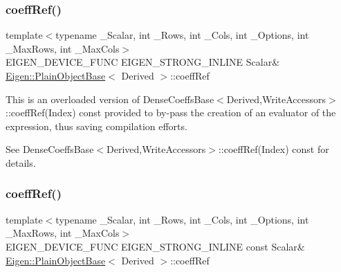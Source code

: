 \subsubsection{\texorpdfstring{coeffRef()}{coeffRef()}\hspace{0.1cm}{\footnotesize\ttfamily [2/4]}}
{\footnotesize\ttfamily template$<$typename \+\_\+\+Scalar, int \+\_\+\+Rows, int \+\_\+\+Cols, int \+\_\+\+Options, int \+\_\+\+Max\+Rows, int \+\_\+\+Max\+Cols$>$ \\
E\+I\+G\+E\+N\+\_\+\+D\+E\+V\+I\+C\+E\+\_\+\+F\+U\+NC E\+I\+G\+E\+N\+\_\+\+S\+T\+R\+O\+N\+G\+\_\+\+I\+N\+L\+I\+NE Scalar\& \mbox{\hyperlink{class_eigen_1_1_plain_object_base}{Eigen\+::\+Plain\+Object\+Base}}$<$ Derived $>$\+::coeff\+Ref\hspace{0.3cm}{\ttfamily [inline]}}

This is an overloaded version of Dense\+Coeffs\+Base$<$\+Derived,\+Write\+Accessors$>$\+::coeff\+Ref(\+Index) const provided to by-\/pass the creation of an evaluator of the expression, thus saving compilation efforts.

See Dense\+Coeffs\+Base$<$\+Derived,\+Write\+Accessors$>$\+::coeff\+Ref(\+Index) const for details. \mbox{\label{class_eigen_1_1_array_ab1b33ee10e4c72ec5cf354d511900e62}} 
\subsubsection{\texorpdfstring{coeffRef()}{coeffRef()}\hspace{0.1cm}{\footnotesize\ttfamily [3/4]}}
{\footnotesize\ttfamily template$<$typename \+\_\+\+Scalar, int \+\_\+\+Rows, int \+\_\+\+Cols, int \+\_\+\+Options, int \+\_\+\+Max\+Rows, int \+\_\+\+Max\+Cols$>$ \\
E\+I\+G\+E\+N\+\_\+\+D\+E\+V\+I\+C\+E\+\_\+\+F\+U\+NC E\+I\+G\+E\+N\+\_\+\+S\+T\+R\+O\+N\+G\+\_\+\+I\+N\+L\+I\+NE const Scalar\& \mbox{\hyperlink{class_eigen_1_1_plain_object_base}{Eigen\+::\+Plain\+Object\+Base}}$<$ Derived $>$\+::coeff\+Ref\hspace{0.3cm}{\ttfamily [inline]}}

